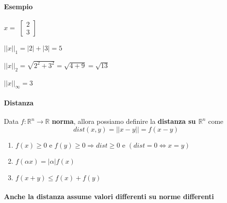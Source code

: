 \documentclass[10pt]{book}
\begin{document}
\paragraph{Esempio} $x = $
\begin{math}
	\left[
	\begin{array}{c}
		2\\3
	\end{array}
	\right]
\end{math}
\begin{list}{}{}
	\item $||x||_1 = |2| + |3| = 5$
	\item $||x||_2 = \sqrt{2^2 + 3^2} = \sqrt{4 + 9} = \sqrt{13}$
	\item $||x||_\infty = 3$
\end{list}
\paragraph{Distanza} Data $f: \mathbb{R}^n \rightarrow \mathbb{R}$ \textbf{norma}, allora possiamo definire la \textbf{distanza su $\mathbb{R}^n$} come $$dist(x, y) = ||x - y|| = f(x - y)$$
\begin{enumerate}
	\item $f(x) \geq 0$ e $f(y)\geq 0 \Rightarrow dist \geq 0$ e $(dist = 0 \Leftrightarrow x  = y)$
	\item $f(\alpha x) = |\alpha|f(x)$
	\item $f(x + y) \leq f(x) + f(y)$
\end{enumerate}
\paragraph{Anche la distanza assume valori differenti su norme differenti}
\end{document}
